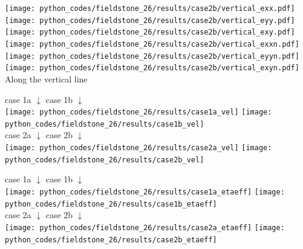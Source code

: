 \begin{center}
\texttt{[image: python\_codes/fieldstone\_26/results/case2b/vertical\_exx.pdf]}
\texttt{[image: python\_codes/fieldstone\_26/results/case2b/vertical\_eyy.pdf]}
\texttt{[image: python\_codes/fieldstone\_26/results/case2b/vertical\_exy.pdf]}\\
\texttt{[image: python\_codes/fieldstone\_26/results/case2b/vertical\_exxn.pdf]}
\texttt{[image: python\_codes/fieldstone\_26/results/case2b/vertical\_eyyn.pdf]}
\texttt{[image: python\_codes/fieldstone\_26/results/case2b/vertical\_exyn.pdf]}\\
{\captionfont Along the vertical line}
\end{center}


\newpage

\begin{center}
case 1a $\downarrow$ \hspace{7cm} case 1b $\downarrow$\\
\texttt{[image: python\_codes/fieldstone\_26/results/case1a\_vel]}
\texttt{[image: python\_codes/fieldstone\_26/results/case1b\_vel]}\\
case 2a $\downarrow$ \hspace{7cm} case 2b $\downarrow$\\
\texttt{[image: python\_codes/fieldstone\_26/results/case2a\_vel]}
\texttt{[image: python\_codes/fieldstone\_26/results/case2b\_vel]}
\end{center}

\begin{center}
case 1a $\downarrow$ \hspace{7cm} case 1b $\downarrow$\\
\texttt{[image: python\_codes/fieldstone\_26/results/case1a\_etaeff]}
\texttt{[image: python\_codes/fieldstone\_26/results/case1b\_etaeff]}\\
case 2a $\downarrow$ \hspace{7cm} case 2b $\downarrow$\\
\texttt{[image: python\_codes/fieldstone\_26/results/case2a\_etaeff]}
\texttt{[image: python\_codes/fieldstone\_26/results/case2b\_etaeff]}
\end{center}




